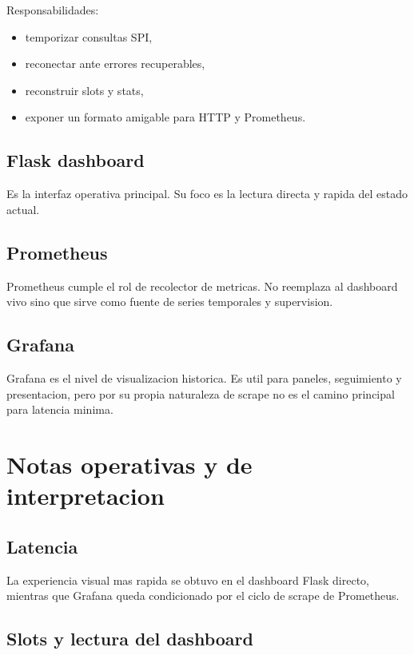 \documentclass[12pt,a4paper]{report}
\begin{document}
Responsabilidades:

\begin{itemize}
    \item temporizar consultas SPI,
    \item reconectar ante errores recuperables,
    \item reconstruir slots y stats,
    \item exponer un formato amigable para HTTP y Prometheus.
\end{itemize}

\section{Flask dashboard}

Es la interfaz operativa principal. Su foco es la lectura directa y rapida del estado actual.

\section{Prometheus}

Prometheus cumple el rol de recolector de metricas. No reemplaza al dashboard vivo sino que sirve como fuente de series temporales y supervision.

\section{Grafana}

Grafana es el nivel de visualizacion historica. Es util para paneles, seguimiento y presentacion, pero por su propia naturaleza de scrape no es el camino principal para latencia minima.

\chapter{Notas operativas y de interpretacion}

\section{Latencia}

La experiencia visual mas rapida se obtuvo en el dashboard Flask directo, mientras que Grafana queda condicionado por el ciclo de scrape de Prometheus.

\section{Slots y lectura del dashboard}
\end{document}
